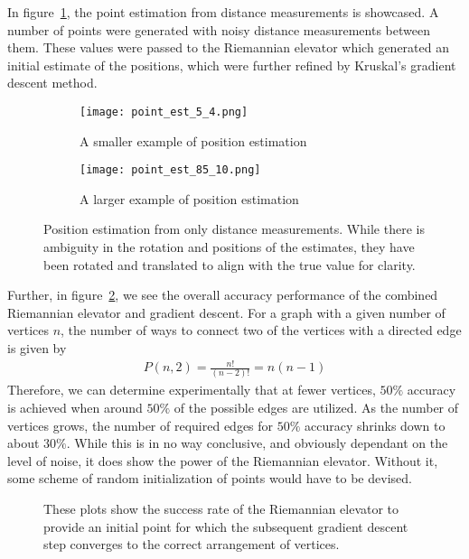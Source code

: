 In figure~\ref{fig:riemann}, the point estimation from distance measurements is showcased. A number of points were generated with noisy distance measurements between them. These values were passed to the Riemannian elevator which generated an initial estimate of the positions, which were further refined by Kruskal's gradient descent method.
\begin{figure}[ht]
    \centering
    \begin{subfigure}{\linewidth}
        \texttt{[image: point\_est\_5\_4.png]}
        \caption{A smaller example of position estimation}
    \end{subfigure}
    \begin{subfigure}{\linewidth}
        \texttt{[image: point\_est\_85\_10.png]}
        \caption{A larger example of position estimation}
    \end{subfigure}
    \caption{Position estimation from only distance measurements. While there is ambiguity in the rotation and positions of the estimates, they have been rotated and translated to align with the true value for clarity.} \label{fig:riemann}
\end{figure}
Further, in figure~\ref{fig:RE-accuracy}, we see the overall accuracy performance of the combined Riemannian elevator and gradient descent. For a graph with a given number of vertices $n$, the number of ways to connect two of the vertices with a directed edge is given by 
\begin{align}
    P(n, 2) = \frac{n!}{(n-2)!} = n (n-1)
\end{align}
Therefore, we can determine experimentally that at fewer vertices, $50\%$ accuracy is achieved when around $50\%$ of the possible edges are utilized. As the number of vertices grows, the number of required edges for $50\%$ accuracy shrinks down to about $30\%$. While this is in no way conclusive, and obviously dependant on the level of noise, it does show the power of the Riemannian elevator. Without it, some scheme of random initialization of points would have to be devised.
\begin{figure}[ht]
    \centering
    
    \caption{These plots show the success rate of the Riemannian elevator to provide an initial point for which the subsequent gradient descent step converges to the correct arrangement of vertices.}
    \label{fig:RE-accuracy}
\end{figure}
